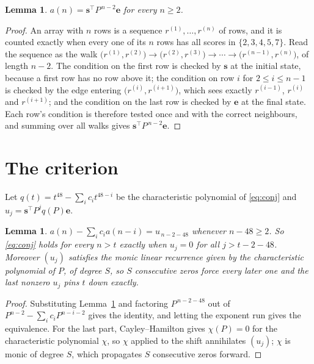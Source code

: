 \documentclass[11pt,a4paper]{article}
\theoremstyle{plain}
\newtheorem{lemma}[theorem]{Lemma}
\theoremstyle{definition}
\begin{document}
\begin{lemma}\label{lem:walk}
$a(n)=\mathbf{s}^{\!\top}P^{\,n-2}\mathbf{e}$ for every $n\ge2$.
\end{lemma}

\begin{proof}
An array with $n$ rows is a sequence $r^{(1)},\dots,r^{(n)}$ of rows, and it is counted
exactly when every one of its $n$ rows has all scores in $\{2,3,4,5,7\}$. Read the sequence as the
walk $\bigl(r^{(1)},r^{(2)}\bigr)\to\bigl(r^{(2)},r^{(3)}\bigr)\to\cdots\to
\bigl(r^{(n-1)},r^{(n)}\bigr)$, of length $n-2$. The condition on the first row is
checked by $\mathbf{s}$ at the initial state, because a first row has no row above it; the
condition on row $i$ for $2\le i\le n-1$ is checked by the edge entering
$\bigl(r^{(i)},r^{(i+1)}\bigr)$, which sees exactly $r^{(i-1)}$, $r^{(i)}$ and
$r^{(i+1)}$; and the condition on the last row is checked by $\mathbf{e}$ at the final
state. Each row's condition is therefore tested once and with the correct neighbours, and
summing over all walks gives $\mathbf{s}^{\!\top}P^{\,n-2}\mathbf{e}$.
\end{proof}

\section{The criterion}

Let $q(t)=t^{48}-\sum_i c_i t^{48-i}$ be the characteristic polynomial of
\eqref{eq:conj} and $u_j=\mathbf{s}^{\!\top}P^{j}q(P)\mathbf{e}$.

\begin{lemma}\label{lem:crit}
$a(n)-\sum_i c_i a(n-i)=u_{\,n-2-48}$ whenever $n-48\ge2$. So \eqref{eq:conj}
holds for every $n>t$ exactly when $u_j=0$ for all $j>t-2-48$. Moreover $(u_j)$
satisfies the monic linear recurrence given by the characteristic polynomial of $P$, of
degree $S$, so $S$ consecutive zeros force every later one and the last nonzero $u_j$ pins
$t$ down exactly.
\end{lemma}

\begin{proof}
Substituting Lemma~\ref{lem:walk} and factoring $P^{\,n-2-48}$ out of
$P^{n-2}-\sum_i c_i P^{n-i-2}$ gives the identity, and letting the exponent run gives the
equivalence. For the last part, Cayley--Hamilton gives $\chi(P)=0$ for the characteristic
polynomial $\chi$, so $\chi$ applied to the shift annihilates $(u_j)$; $\chi$ is monic of
degree $S$, which propagates $S$ consecutive zeros forward.
\end{proof}
\end{document}
